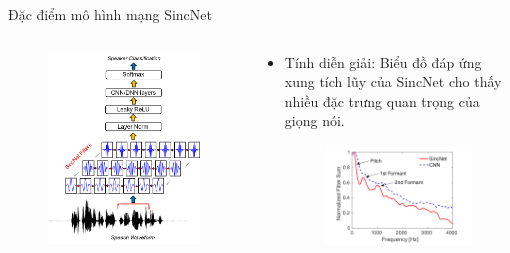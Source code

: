 \documentclass[11pt]{beamer}
\begin{document}
\begin{frame}{Đặc điểm mô hình mạng SincNet}
	\begin{columns}
		\begin{column}{0.47\textwidth}
			\begin{figure}[H]
				\includegraphics[width=0.9\linewidth]{images/SincNet.png}
			\end{figure}
		\end{column}
		\begin{column}{0.5\textwidth}
			\begin{itemize}
				\item Tính diễn giải: Biểu đồ đáp ứng xung tích lũy của SincNet cho thấy nhiều đặc trưng quan trọng của giọng nói. 
				\begin{figure}[H]
					\includegraphics[width=0.9\linewidth]{images/interpretability.png}
				\end{figure}
			\end{itemize}
		\end{column}
	\end{columns}
\end{frame}
\end{document}
